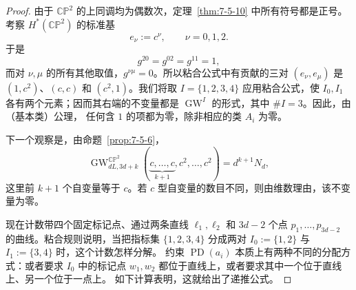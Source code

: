 \begin{proof}
由于 $\mathbb{CP}^2$ 的上同调均为偶数次，定理~\ref{thm:7-5-10} 中所有符号都是正号。
考察 $H^*(\mathbb{CP}^2)$ 的标准基
\[
  e_\nu:=c^\nu,\qquad \nu=0,1,2.
\]
于是
\[
  g^{20}=g^{02}=g^{11}=1,
\]
而对 $\nu,\mu$ 的所有其他取值，$g^{\nu\mu}=0$。所以粘合公式中有贡献的三对
$(e_\nu,e_\mu)$ 是 $(1,c^2)$、$(c,c)$ 和 $(c^2,1)$。我们将取
$I=\{1,2,3,4\}$ 应用粘合公式，使 $I_0,I_1$ 各有两个元素；因而其右端的不变量都是
$\operatorname{GW}^I$ 的形式，其中 $\#I=3$。因此，由（基本类）公理，
任何含 $1$ 的项都为零，除非相应的类 $A_i$ 为零。

下一个观察是，由命题~\ref{prop:7-5-6}，
\begin{equation}\label{eq:7-5-3}
  \operatorname{GW}_{dL,3d+k}^{\mathbb{CP}^2}
  (\underbrace{c,\ldots,c}_{k+1},c^2,\ldots,c^2)
  =d^{k+1}N_d,
\end{equation}
这里前 $k+1$ 个自变量等于 $c$。若 $c$ 型自变量的数目不同，则由维数理由，该不变量为零。

现在计数带四个固定标记点、通过两条直线 $\ell_1,\ell_2$ 和
$3d-2$ 个点 $p_1,\ldots,p_{3d-2}$ 的曲线。粘合规则说明，当把指标集
$\{1,2,3,4\}$ 分成两对 $I_0:=\{1,2\}$ 与 $I_1:=\{3,4\}$ 时，这个计数怎样分解。
约束 $\operatorname{PD}(a_i)$ 本质上有两种不同的分配方式：或者要求
$I_0$ 中的标记点 $w_1,w_2$ 都位于直线上，或者要求其中一个位于直线上、另一个位于一点上。
如下计算表明，这就给出了递推公式。


\end{proof}
